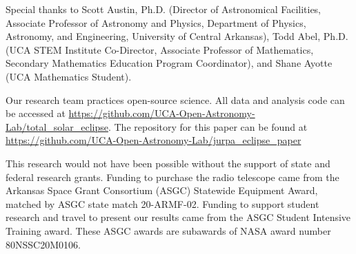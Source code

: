 \noindent Special thanks to Scott Austin, Ph.D. (Director of Astronomical Facilities, Associate Professor of Astronomy and Physics, Department of Physics, Astronomy, and Engineering, University of Central Arkansas), Todd Abel, Ph.D. (UCA STEM Institute Co-Director, Associate Professor of Mathematics, Secondary Mathematics Education Program Coordinator), and Shane Ayotte (UCA Mathematics Student).

Our research team practices open-source science. All data and analysis code can be accessed at \url{https://github.com/UCA-Open-Astronomy-Lab/total_solar_eclipse}. The repository for this paper can be found at \url{https://github.com/UCA-Open-Astronomy-Lab/jurpa_eclipse_paper}

This research would not have been possible without the support of state and federal research grants. Funding to purchase the radio telescope came from the Arkansas Space Grant Consortium (ASGC) Statewide Equipment Award, matched by ASGC state match 20-ARMF-02. Funding to support student research and travel to present our results came from the ASGC Student Intensive Training award. These ASGC awards are subawards of NASA award number 80NSSC20M0106.
